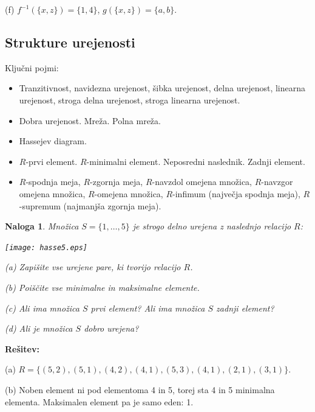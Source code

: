 \documentclass[11pt,paper=b5,footinclude,headinclude]{scrbook} %
\newtheorem*{problem}{Naloga}
\begin{document}
(f) $f^{-1}(\{x,z\}) = \{1,4\}$, $g(\{x,z\}) = \{a,b\}$.
%
%
%
%

\subsection{Strukture urejenosti}
Ključni pojmi:
\begin{itemize}
\item Tranzitivnost, navidezna urejenost, šibka urejenost, delna urejenost,
linearna urejenost, stroga delna urejenost, stroga linearna urejenost.
\item Dobra urejenost. Mreža. Polna mreža.
\item Hassejev diagram.
\item $R$-prvi element. $R$-minimalni element. Neposredni naslednik. Zadnji element.
\item $R$-spodnja meja, $R$-zgornja meja, $R$-navzdol omejena množica, $R$-navzgor omejena
množica, $R$-omejena množica, $R$-infimum (največja spodnja meja),
$R$-supremum (najmanjša zgornja meja).
\end{itemize}

\begin{problem}
Množica $S=\{1,\ldots,5\}$ je strogo delno urejena z naslednjo relacijo $R$:
\begin{center}
\texttt{[image: hasse5.eps]}
\end{center}

(a) Zapišite vse urejene pare, ki tvorijo relacijo $R$.

(b) Poiščite vse minimalne in maksimalne elemente.

(c) Ali ima množica $S$ prvi element? Ali ima množica $S$ zadnji element?

(d) Ali je množica $S$ dobro urejena?
\end{problem}

\textbf{Rešitev:}

(a) $R = \{(5,2),(5,1),(4,2),(4,1),(5,3),(4,1),(2,1),(3,1)\}$.

(b) Noben element ni pod elementoma 4 in 5, torej sta 4 in 5 minimalna elementa.
Maksimalen element pa je samo eden: 1.
\end{document}

